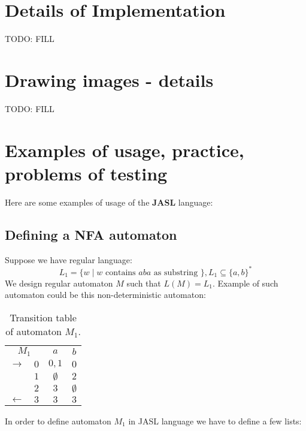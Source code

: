\documentclass{ctuthesis}
\begin{document}
\chapter{Details of Implementation}
TODO: FILL

\chapter{Drawing images - details}
TODO: FILL

\chapter{Examples of usage, practice, problems of testing}
Here are some examples of usage of the \textbf{JASL} language: 

\section{Defining a NFA automaton}
Suppose we have regular language: 
\begin{equation*}
L_1 = \{w \mid w \text{ contains } aba \text{ as substring }\}, L_1 \subseteq \{a, b\}^*
\end{equation*} 
We design regular automaton $M$ such that $L(M) = L_1$. Example of such automaton could be this non-deterministic automaton:
\begin{table}[H]
\begin{ctucolortab}
\begin{tabular}{cc|cc}
\multicolumn{2}{c}{\bfseries $M_1$} & \bfseries $a$ & \bfseries $b$ \\\Midrule
$\rightarrow$ 	& $0$ & $0,1$ 	& $0$  \\
				& $1$ & $\emptyset$ 	& $2$  \\
				& $2$ & $3$		& $\emptyset$  \\
$\leftarrow$	& $3$ & $3$		& $3$ 
\end{tabular}
\end{ctucolortab}
\caption{Transition table of automaton $M_1$.}
\label{$M_1$:table}
\end{table} 

In order to define automaton $M_1$ in JASL language we have to define a few lists: 
\end{document}
